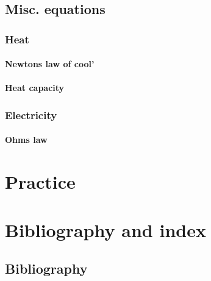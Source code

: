 \documentclass[11pt,fleqn]{book} %
\begin{document}
\chapter{Misc. equations}

\section{Heat}

\subsection{Newtons law of cool'}

\subsection{Heat capacity}

\section{Electricity}

\subsection{Ohms law}


\part{Practice}


\part{Bibliography and index}



\chapter*{Bibliography}
\end{document}
